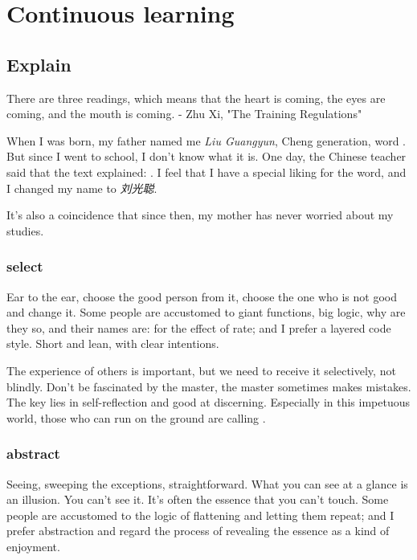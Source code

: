 \chapter{Continuous learning} 
\label{ch:learning}


\section{Explain}

\begin{content}

\begin{remark}
There are three readings, which means that the heart is coming, the eyes are coming, and the mouth is coming. - Zhu Xi, "The Training Regulations"
\end{remark}

When I was born, my father named me \emph{Liu Guangyun}, Cheng  generation, word . But since I went to school, I don’t know what it is. One day, the Chinese teacher said that the text explained: . I feel that I have a special liking for the  word, and I changed my name to \emph{刘光聪}.

It’s also a coincidence that since then, my mother has never worried about my studies.

\subsection{select}

Ear to the ear, choose the good person from it, choose the one who is not good and change it. Some people are accustomed to giant functions, big logic, why are they so, and their names are: for the effect of  rate; and I prefer a layered code style. Short and lean, with clear intentions.

The experience of others is important, but we need to receive it selectively, not blindly. Don't be fascinated by the master, the master sometimes makes mistakes. The key lies in self-reflection and good at discerning. Especially in this impetuous world, those who can run on the ground are calling .

\subsection{abstract}

Seeing, sweeping the exceptions, straightforward. What you can see at a glance is an illusion. You can't see it. It's often the essence that you can't touch. Some people are accustomed to the logic of flattening and letting them repeat; and I prefer abstraction and regard the process of revealing the essence as a kind of enjoyment.


\end{content}
